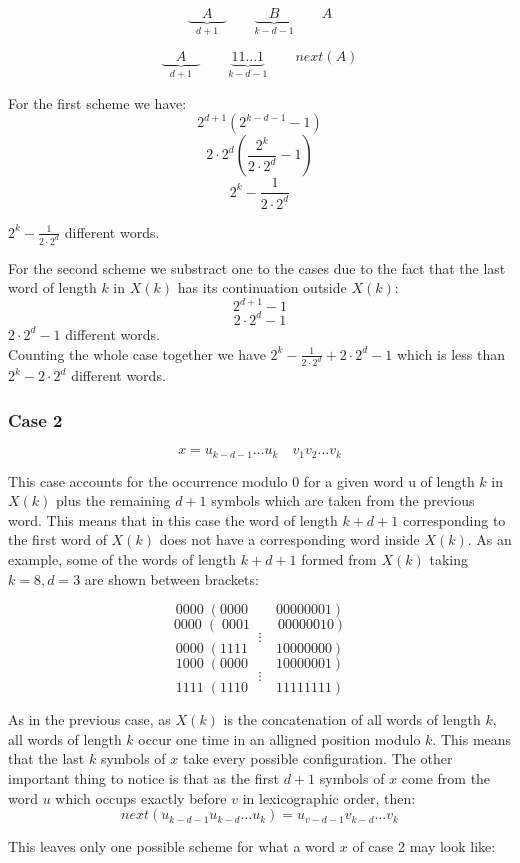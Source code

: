 \documentclass[11pt,a4paper]{tesis}
\theoremstyle{definition}
\begin{document}
$$\underbrace{\quad A \quad }_{d +1} \qquad \underbrace{\quad B \quad }_{k - d - 1}  \qquad A$$


$$\underbrace{\quad A \quad }_{d +1} \qquad \underbrace{ 11 \dots 1  }_{k - d - 1}  \qquad next(A) $$

For the first scheme we have:
$$2^{d + 1}  (2^{k - d - 1} - 1)$$
$$ 2\cdot2^{d}  (\frac{2^k}{2\cdot2^d} - 1)$$
$$ 2^k - \frac{1}{2\cdot2^{d} }$$

$ 2^k - \frac{1}{2\cdot2^{d} }$ different words.

For the second scheme we substract one to the cases due to the fact that the last word of length $k$ in $X(k)$ has its continuation outside $X(k)$:
$$2^{d + 1}   - 1$$
$$2\cdot 2^d - 1$$
$ 2\cdot 2^d - 1 $ different words.
\\

Counting the whole case together we have $  2^k - \frac{1}{2\cdot2^{d} } + 2\cdot 2^d - 1$ which is less than $2^k -  2\cdot 2^d$ different words.

\subsubsection{Case 2}
$$ x = u_{k-d-1} \dots u_k \quad v_1 v_2 \dots v_k$$

This case accounts for the occurrence modulo 0 for a given word u of length $k$ in $X(k)$ plus the remaining $d + 1$ symbols which are taken from the previous word. This means that in this case the word of length $k + d + 1$ corresponding to the first word of $X(k)$ does not have a corresponding word inside $X(k)$.
As an example, some of the words of length $k + d + 1$ formed from $X(k)$ taking $k = 8, d = 3$ are shown between brackets:

$$0000 \; (0000 \qquad 00000001)$$
$$0000 \; ( \; 0001 \qquad 00000010)$$
$$\vdots$$
$$0000 \; (1111 \qquad 10000000)$$
$$1000 \; (0000 \qquad 10000001)$$
$$\vdots$$
$$1111 \; (1110 \qquad 11111111)$$

As in the previous case, as $X(k)$ is the concatenation of all words of length $k$, all words of length $k$ occur one time in an alligned position modulo $k$. This means that the last $k$ symbols of $x$ take every possible configuration.
The other important thing to notice is that as the first $d + 1$ symbols of $x$ come from the word $u$ which occups exactly before $v$ in lexicographic order, then: 
$$next(u_{k-d-1} u_{k-d} \dots u_k) = u_{v-d-1} v_{k-d} \dots v_k$$

This leaves only one possible scheme for what a word $x$ of case 2 may look like:
\end{document}
